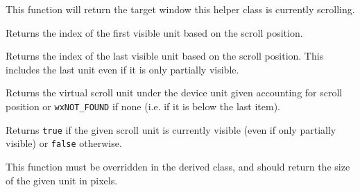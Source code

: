 
This function will return the target window this helper class is currently
scrolling.




\label{wxvarscrollhelperbasegetvisiblebegin}


Returns the index of the first visible unit based on the scroll position.


\label{wxvarscrollhelperbasegetvisibleend}


Returns the index of the last visible unit based on the scroll position. This
includes the last unit even if it is only partially visible.


\label{wxvarscrollhelperbasevirtualhittest}


Returns the virtual scroll unit under the device unit given accounting for
scroll position or {\tt wxNOT\_FOUND} if none (i.e. if it is below the last
item).


\label{wxvarscrollhelperbaseisvisible}


Returns {\tt true} if the given scroll unit is currently visible (even if only
partially visible) or {\tt false} otherwise.


\label{wxvarscrollhelperbaseongetunitsize}


This function must be overridden in the derived class, and should return the
size of the given unit in pixels.


\label{wxvarscrollhelperbaseongetunitssizehint}


